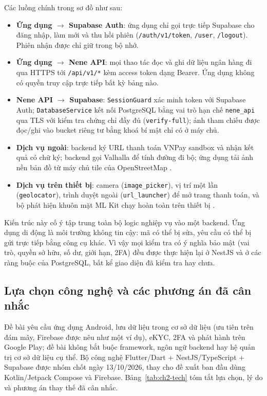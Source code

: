 Các luồng chính trong sơ đồ như sau:
\begin{itemize}
  \item \textbf{Ứng dụng $\rightarrow$ Supabase Auth}: ứng dụng chỉ gọi trực tiếp Supabase cho đăng nhập, làm mới và thu hồi phiên (\texttt{/\allowbreak{}auth/\allowbreak{}v1/\allowbreak{}token}, \texttt{/\allowbreak{}user}, \texttt{/\allowbreak{}logout}). Phiên nhận được chỉ giữ trong bộ nhớ.
  \item \textbf{Ứng dụng $\rightarrow$ Nene API}: mọi thao tác đọc và ghi dữ liệu ngân hàng đi qua HTTPS tới \texttt{/\allowbreak{}api/\allowbreak{}v1/\allowbreak{}*} kèm access token dạng Bearer. Ứng dụng không có quyền truy cập trực tiếp bất kỳ bảng nào.
  \item \textbf{Nene API $\rightarrow$ Supabase}: \texttt{SessionGuard} xác minh token với Supabase Auth; \texttt{Database\allowbreak{}Service} kết nối PostgreSQL bằng vai trò hạn chế \texttt{nene\_\allowbreak{}api} qua TLS với kiểm tra chứng chỉ đầy đủ (\texttt{verify-\allowbreak{}full}); ảnh tham chiếu được đọc/ghi vào bucket riêng tư bằng khoá bí mật chỉ có ở máy chủ.
  \item \textbf{Dịch vụ ngoài}: backend ký URL thanh toán VNPay sandbox và nhận kết quả có chữ ký; backend gọi Valhalla để tính đường đi bộ; ứng dụng tải ảnh nền bản đồ từ máy chủ tile của OpenStreetMap \parencite{ch2-osm-tiles}.
  \item \textbf{Dịch vụ trên thiết bị}: camera (\texttt{image\_\allowbreak{}picker}), vị trí một lần (\texttt{geolocator}), trình duyệt ngoài (\texttt{url\_\allowbreak{}launcher}) để mở trang thanh toán, và bộ phát hiện khuôn mặt ML Kit chạy hoàn toàn trên thiết bị \parencite{ch2-mlkit-face}.
\end{itemize}

Kiến trúc này cố ý tập trung toàn bộ logic nghiệp vụ vào một backend. Ứng dụng di động là môi trường không tin cậy: mã có thể bị sửa, yêu cầu có thể bị gửi trực tiếp bằng công cụ khác. Vì vậy mọi kiểm tra có ý nghĩa bảo mật (vai trò, quyền sở hữu, số dư, giới hạn, 2FA) đều được thực hiện lại ở NestJS và ở các ràng buộc của PostgreSQL, bất kể giao diện đã kiểm tra hay chưa.

\subsection{Lựa chọn công nghệ và các phương án đã cân nhắc}
\label{sec:ch2-tech}

Đề bài yêu cầu ứng dụng Android, lưu dữ liệu trong cơ sở dữ liệu (ưu tiên trên đám mây, Firebase được nêu như một ví dụ), eKYC, 2FA và phát hành trên Google Play; đề bài không bắt buộc framework, ngôn ngữ backend hay hệ quản trị cơ sở dữ liệu cụ thể. Bộ công nghệ Flutter/Dart + NestJS/TypeScript + Supabase được nhóm chốt ngày 13/10/2026, thay cho đề xuất ban đầu dùng Kotlin/Jetpack Compose và Firebase. Bảng~\ref{tab:ch2-tech} tóm tắt lựa chọn, lý do và phương án thay thế đã cân nhắc.


